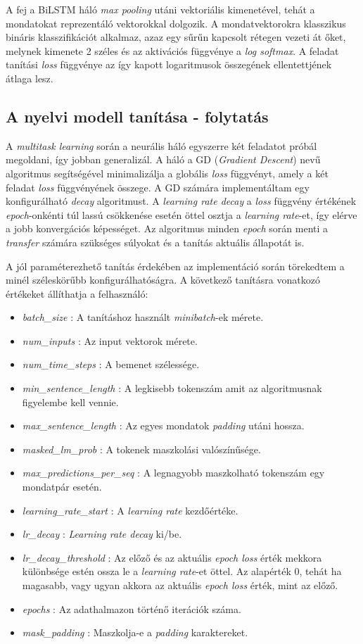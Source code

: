 A fej a BiLSTM háló \textit{max pooling} utáni vektoriális kimenetével, tehát a mondatokat reprezentáló vektorokkal dolgozik. A mondatvektorokra klasszikus bináris klasszifikációt alkalmaz, azaz egy sűrűn kapcsolt rétegen vezeti át őket, melynek kimenete 2 széles és az aktivációs függvénye a \textit{log softmax}. A feladat tanítási \textit{loss} függvénye az így kapott logaritmusok összegének ellentettjének átlaga lesz.

\subsection*{A nyelvi modell tanítása - folytatás}
A \textit{multitask learning} során a neurális háló egyszerre két feladatot próbál megoldani, így jobban generalizál. A háló a GD (\textit{Gradient Descent}) nevű algoritmus segítségével minimalizálja a globális \textit{loss} függvényt, amely a két feladat \textit{loss} függvényének összege.
A GD számára implementáltam egy konfigurálható \textit{decay} algoritmust. A \textit{learning rate decay} a \textit{loss} függvény értékének \textit{epoch}-onkénti túl lassú csökkenése esetén öttel osztja a \textit{learning rate}-et, így elérve a jobb konvergációs képességet. Az algoritmus minden \textit{epoch} során menti a \textit{transfer} számára szükséges súlyokat és a tanítás aktuális állapotát is.

A jól paraméterezhető tanítás érdekében az implementáció során törekedtem a minél széleskörűbb konfigurálhatóságra. A következő tanításra vonatkozó értékeket állíthatja a felhasználó:
\begin{itemize}
	\item \textit{batch\_size} : A tanításhoz használt \textit{minibatch}-ek mérete.
	\item \textit{num\_inputs} : Az input vektorok mérete.
	\item \textit{num\_time\_steps} : A bemenet szélessége.
	\item \textit{min\_sentence\_length} : A legkisebb tokenszám amit az algoritmusnak figyelembe kell vennie.
	\item \textit{max\_sentence\_length} : Az egyes mondatok \textit{padding} utáni hossza.
	\item \textit{masked\_lm\_prob} : A tokenek maszkolási valószínűsége.
	\item \textit{max\_predictions\_per\_seq} : A legnagyobb maszkolható tokenszám egy mondatpár esetén.
	
	\item \textit{learning\_rate\_start} : A \textit{learning rate} kezdőértéke.
	\item \textit{lr\_decay} : \textit{Learning rate decay} ki/be.
	\item \textit{lr\_decay\_threshold} : Az előző és az aktuális \textit{epoch loss} érték mekkora különbsége estén ossza le a \textit{learning rate}-et öttel. Az alapérték 0, tehát ha magasabb, vagy ugyan akkora az aktuális \textit{epoch loss} érték, mint az előző.
	\item \textit{epochs} : Az adathalmazon történő iterációk száma.
	\item \textit{mask\_padding} : Maszkolja-e a \textit{padding} karaktereket.
\end{itemize}

